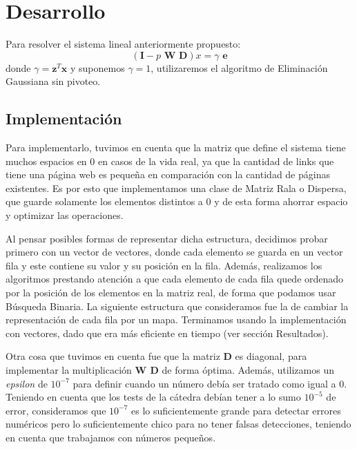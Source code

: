 \section{Desarrollo}

Para resolver el sistema lineal anteriormente propuesto:
\begin{equation*}
(\textbf{I} - \textit{p } \textbf{W D}) x = \gamma \textbf{ e}
\end{equation*}
donde $\gamma = \textbf{z}^T \textbf{x}$ y suponemos $\gamma = 1$,
utilizaremos el algoritmo de Eliminaci\'on Gaussiana sin pivoteo. \\

\subsection{Implementación}
Para implementarlo, tuvimos en cuenta que la matriz que define el sistema
tiene muchos espacios en 0 en casos de la vida real, ya que la cantidad de links
que tiene una página web es pequeña en comparación con la cantidad de páginas
existentes. Es por esto que implementamos una clase de Matriz Rala o Dispersa,
que guarde solamente los elementos distintos a 0 y de esta forma ahorrar espacio y optimizar
las operaciones.

Al pensar posibles formas de representar dicha estructura, decidimos probar primero con un vector de vectores, donde cada elemento se guarda en un vector fila y este contiene su valor y su posición en la fila. Además, realizamos los algoritmos prestando atención a que cada elemento de cada fila quede ordenado por la posición de los elementos en la matriz real, de forma que podamos usar Búsqueda Binaria. La siguiente estructura que consideramos fue la de cambiar la representación de cada fila por un mapa. Terminamos usando la implementación con vectores, dado que era más eficiente en tiempo (ver sección Resultados).

Otra cosa que tuvimos en cuenta fue que la matriz \textbf{D} es diagonal, para implementar la multiplicación \textbf{W D} de forma óptima. Además, utilizamos un \textit{epsilon} de $10^{-7}$ para definir cuando un número debía ser tratado como igual a 0. Teniendo en cuenta que los tests de la cátedra debían tener a lo sumo $10^{-5}$ de error, consideramos que $10^{-7}$ es lo suficientemente grande para detectar errores numéricos pero lo suficientemente chico para no tener falsas detecciones, teniendo en cuenta que trabajamos con números pequeños.

